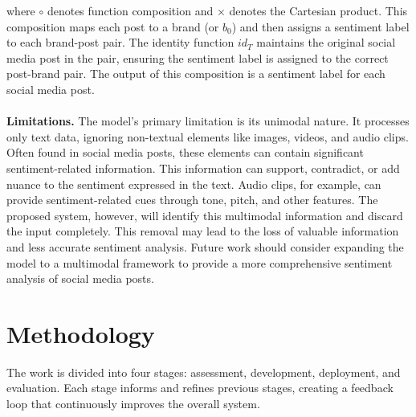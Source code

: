 \documentclass{article}
\begin{document}
where $\circ$ denotes function composition and $\times$ denotes the Cartesian
product. This composition maps each post to a brand (or $b_0$) and then assigns
a sentiment label to each brand-post pair. The identity function $id_T$
maintains the original social media post in the pair, ensuring the sentiment
label is assigned to the correct post-brand pair. The output of this
composition is a sentiment label for each social media post.\\
\\
\textbf{Limitations.} The model's primary limitation is its unimodal nature. It
processes only text data, ignoring non-textual elements like images, videos,
and audio clips. Often found in social media posts, these elements can contain
significant sentiment-related information. This information can support,
contradict, or add nuance to the sentiment expressed in the text. Audio clips,
for example, can provide sentiment-related cues through tone, pitch, and other
features. The proposed system, however, will identify this multimodal
information and discard the input completely. This removal may lead to the loss
of valuable information and less accurate sentiment analysis. Future work
should consider expanding the model to a multimodal framework to provide a more
comprehensive sentiment analysis of social media posts.

\section{Methodology}

The work is divided into four stages: assessment, development, deployment, and
evaluation. Each stage informs and refines previous stages, creating a feedback
loop that continuously improves the overall system.
\end{document}
